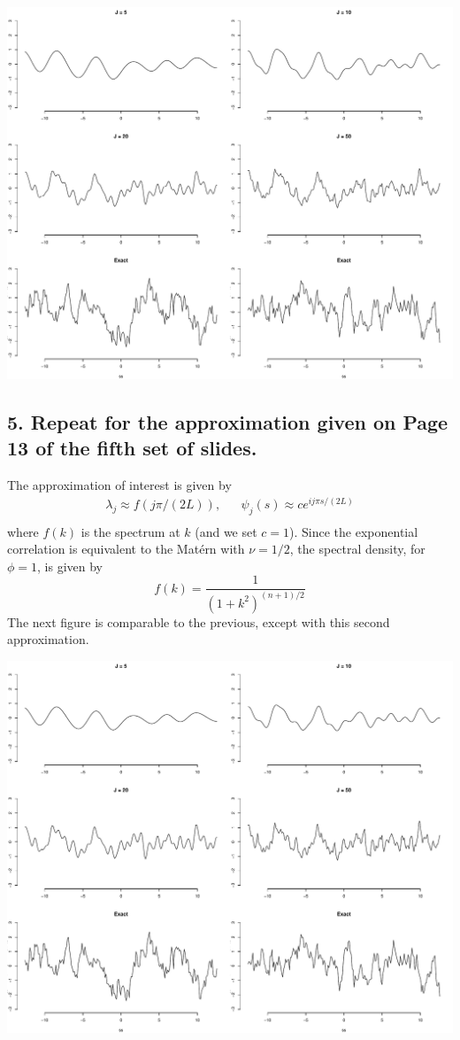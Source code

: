 \documentclass[12pt]{article}
\begin{document}
\begin{center}
\includegraphics[scale=0.5]{figs/no3.pdf}
\end{center}

\subsection*{5. Repeat for the approximation given on Page 13 of the fifth set of slides.}

The approximation of interest is given by
\begin{align*}
\lambda_j\approx f(j\pi/(2L)), & & \psi_j(s)\approx ce^{ij\pi s/(2L)} \\
\end{align*}
where $f(k)$ is the spectrum at $k$ (and we set $c=1$). Since the exponential correlation is equivalent to the Mat{\'e}rn with $\nu=1/2$, the spectral density, for $\phi=1$, is given by
\[ f(k) = \frac{1}{(1+k^2)^{(n+1)/2}} \]
The next figure is comparable to the previous, except with this second approximation.

\begin{center}
\includegraphics[scale=0.5]{figs/no4.pdf}
\end{center}
\end{document}
